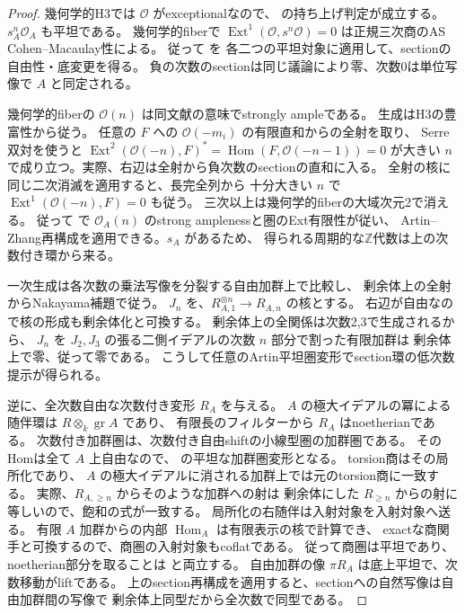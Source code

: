 \begin{proof}
幾何学的H3では $\mathcal O$ がexceptionalなので、
\cite[命題5.1]{VdBFormalAbelian}の持ち上げ判定が成立する。
$s_A^n\mathcal O_A$ も平坦である。
幾何学的fiberで $\operatorname{Ext}^1(\mathcal O,s^n\mathcal O)=0$
は正規三次商のAS Cohen--Macaulay性による。
従って \cite[命題5.3]{VdBFormalAbelian}を
各二つの平坦対象に適用して、sectionの自由性・底変更を得る。
負の次数のsectionは同じ議論により零、次数0は単位写像で $A$ と同定される。

幾何学的fiberの $\mathcal O(n)$ は同文献の意味でstrongly ampleである。
生成はH3の豊富性から従う。
任意の $F$ への $\mathcal O(-m_i)$ の有限直和からの全射を取り、
Serre双対を使うと
$\operatorname{Ext}^2(\mathcal O(-n),F)^*=\operatorname{Hom}(F,\mathcal O(-n-1))=0$
が大きい $n$ で成り立つ。実際、右辺は全射から負次数のsectionの直和に入る。
全射の核に同じ二次消滅を適用すると、長完全列から
十分大きい $n$ で $\operatorname{Ext}^1(\mathcal O(-n),F)=0$ も従う。
三次以上は幾何学的fiberの大域次元2で消える。
従って \cite[定理4.2]{VdBFormalAbelian}で
$\mathcal O_A(n)$ のstrong amplenessと圏のExt有限性が従い、
Artin--Zhang再構成を適用できる。$s_A$ があるため、
得られる周期的な$\mathbb Z$代数は上の次数付き環から来る。

一次生成は各次数の乗法写像を分裂する自由加群上で比較し、
剰余体上の全射からNakayama補題で従う。
$J_n$ を、$R_{A,1}^{\otimes n}\to R_{A,n}$ の核とする。
右辺が自由なので核の形成も剰余体化と可換する。
剰余体上の全関係は次数2,3で生成されるから、
$J_n$ を $J_2,J_3$ の張る二側イデアルの次数 $n$ 部分で割った有限加群は
剰余体上で零、従って零である。
こうして任意のArtin平坦圏変形でsection環の低次数提示が得られる。

逆に、全次数自由な次数付き変形 $R_A$ を与える。
$A$ の極大イデアルの冪による随伴環は $R\otimes_k\operatorname{gr} A$ であり、
有限長のフィルターから $R_A$ はnoetherianである。
次数付き加群圏は、次数付き自由shiftの小線型圏の加群圏である。
そのHomは全て $A$ 上自由なので、
\cite[定理8.16]{LowenVdBFlatAbelian}の平坦な加群圏変形となる。
torsion商はその局所化であり、
$A$ の極大イデアルに消される加群上では元のtorsion商に一致する。
実際、$R_{A,\ge n}$ からそのような加群への射は
剰余体にした $R_{\ge n}$ からの射に等しいので、飽和の式が一致する。
局所化の右随伴は入射対象を入射対象へ送る。
有限 $A$ 加群からの内部 $\operatorname{Hom}_A$ は有限表示の核で計算でき、
exactな商関手と可換するので、商圏の入射対象もcoflatである。
従って商圏は平坦であり、noetherian部分を取ることは
\cite[定理7.1, 8.8]{LowenVdBFlatAbelian}と両立する。
自由加群の像 $\pi R_A$ は底上平坦で、次数移動がliftである。
上のsection再構成を適用すると、sectionへの自然写像は自由加群間の写像で
剰余体上同型だから全次数で同型である。
\end{proof}

